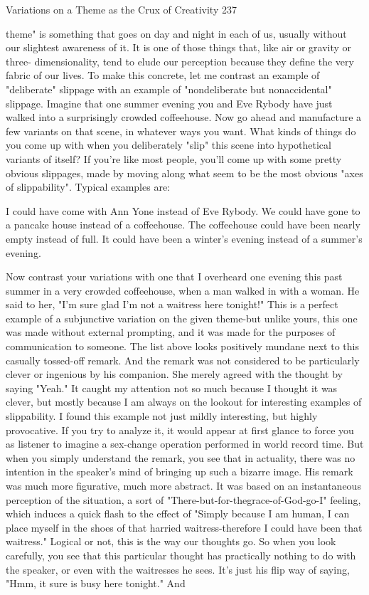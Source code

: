 Variations on a Theme as the Crux of Creativity                                     237

theme" is something that goes on day and night in each of us, usually without our
slightest awareness of it. It is one of those things that, like air or gravity or three-
dimensionality, tend to elude our perception because they define the very fabric of our
lives.
        To make this concrete, let me contrast an example of "deliberate" slippage
with an example of "nondeliberate but nonaccidental" slippage. Imagine that one
summer evening you and Eve Rybody have just walked into a surprisingly crowded
coffeehouse. Now go ahead and manufacture a few variants on that scene, in whatever
ways you want. What kinds of things do you come up with when you deliberately
"slip" this scene into hypothetical variants of itself?
        If you're like most people, you'll come up with some pretty obvious slippages,
made by moving along what seem to be the most obvious "axes of slippability".
Typical examples are:

   I could have come with Ann Yone instead of Eve Rybody.
   We could have gone to a pancake house instead of a coffeehouse.
   The coffeehouse could have been nearly empty instead of full.
   It could have been a winter's evening instead of a summer's evening.

        Now contrast your variations with one that I overheard one evening this past
summer in a very crowded coffeehouse, when a man walked in with a woman. He
said to her, "I'm sure glad I'm not a waitress here tonight!" This is a perfect example
of a subjunctive variation on the given theme-but unlike yours, this one was made
without external prompting, and it was made for the purposes of communication to
someone. The list above looks positively mundane next to this casually tossed-off
remark. And the remark was not considered to be particularly clever or ingenious by
his companion. She merely agreed with the thought by saying "Yeah." It caught my
attention not so much because I thought it was clever, but mostly because I am always
on the lookout for interesting examples of slippability.
        I found this example not just mildly interesting, but highly provocative. If you
try to analyze it, it would appear at first glance to force you as listener to imagine a
sex-change operation performed in world record time. But when you simply
understand the remark, you see that in actuality, there was no intention in the
speaker's mind of bringing up such a bizarre image. His remark was much more
figurative, much more abstract. It was based on an instantaneous perception of the
situation, a sort of "There-but-for-thegrace-of-God-go-I" feeling, which induces a
quick flash to the effect of "Simply because I am human, I can place myself in the
shoes of that harried waitress-therefore I could have been that waitress." Logical or
not, this is the way our thoughts go.
        So when you look carefully, you see that this particular thought has practically
nothing to do with the speaker, or even with the waitresses he sees. It's just his flip
way of saying, "Hmm, it sure is busy here tonight." And




